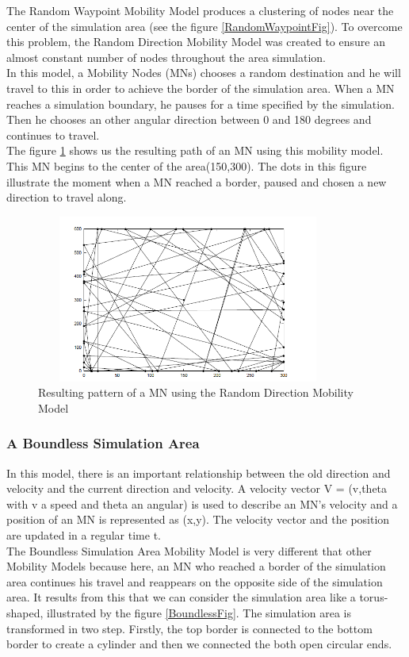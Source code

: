 The Random Waypoint Mobility Model produces a clustering of nodes near the center of the simulation area (see the figure \ref{RandomWaypointFig}). To overcome this problem, the Random Direction Mobility Model was created to ensure an almost constant number of nodes throughout the area simulation.\\ 
In this model, a Mobility Nodes (MNs) chooses a random destination and he will travel to this in order to achieve the border of the simulation area. When a MN reaches a simulation boundary, he pauses for a time specified by the simulation. Then he chooses an other angular direction between 0 and 180 degrees and continues to travel.\\ 
The figure \ref{RandomDirectionFig} shows us the resulting path of an MN using this mobility model. This MN begins to the center of the area(150,300). The dots in this figure illustrate the moment when a MN reached a border, paused and chosen a new direction to travel along.\\

\begin{figure}[h]
\center
\includegraphics[width=10cm,height=55mm]{../images/randomdirection1.png}
\caption{\label{RandomDirectionFig}Resulting pattern of a MN using the Random Direction Mobility Model}
\end{figure}

\newpage

\subsubsection{A Boundless Simulation Area}

In this model, there is an important relationship between the old direction and velocity and the current direction and velocity. A velocity vector V = (v,theta with v a speed and theta an angular) is used to describe an MN's velocity and a position of an MN is represented as (x,y). The velocity vector and the position are updated in a regular time t.\\
The Boundless Simulation Area Mobility Model is very different that other Mobility Models because here, an MN who reached a border of the simulation area continues his travel and reappears on the opposite side of the simulation area. It results from this that we can consider the simulation area like a torus-shaped, illustrated by the figure \ref{BoundlessFig}. The simulation area is transformed in two step. Firstly, the top border is connected to the bottom border to create a cylinder and then we connected the both open circular ends.\\

